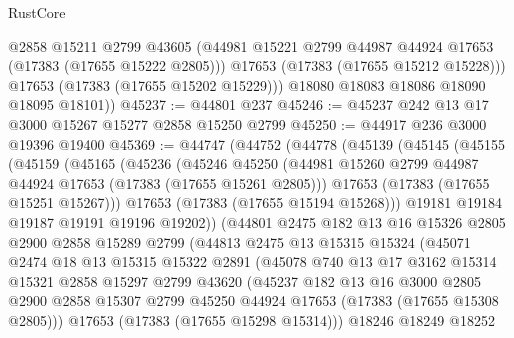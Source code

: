 \begin{lexlean}{RustCore}
\begin{coremodule}
            @2858
            @15211
            @2799
            @43605
            (@44981 @15221 @2799 @44987 @44924 @17653 (@17383 (@17655 @15222 @2805)))
            @17653
            (@17383 (@17655 @15212 @15228)))
          @17653
          (@17383 (@17655 @15202 @15229)))
        @18080
        @18083
        @18086
        @18090
        @18095
        @18101))
@45237 := @44801 @237
@45246 := @45237 @242 @13 @17 @3000 @15267 @15277 @2858 @15250 @2799
@45250 := @44917 @236 @3000 @19396 @19400
@45369 := @44747
    (@44752
      (@44778
        (@45139
          (@45145
            (@45155
              (@45159
                (@45165
                  (@45236
                    (@45246
                      @45250
                      (@44981 @15260 @2799 @44987 @44924 @17653 (@17383 (@17655 @15261 @2805)))
                      @17653
                      (@17383 (@17655 @15251 @15267)))
                    @17653
                    (@17383 (@17655 @15194 @15268)))
                  @19181
                  @19184
                  @19187
                  @19191
                  @19196
                  @19202))
              (@44801
                @2475
                @182
                @13
                @16
                @15326
                @2805
                @2900
                @2858
                @15289
                @2799
                (@44813
                  @2475
                  @13
                  @15315
                  @15324
                  (@45071
                    @2474
                    @18
                    @13
                    @15315
                    @15322
                    @2891
                    (@45078
                      @740
                      @13
                      @17
                      @3162
                      @15314
                      @15321
                      @2858
                      @15297
                      @2799
                      @43620
                      (@45237
                        @182
                        @13
                        @16
                        @3000
                        @2805
                        @2900
                        @2858
                        @15307
                        @2799
                        @45250
                        @44924
                        @17653
                        (@17383 (@17655 @15308 @2805)))
                      @17653
                      (@17383 (@17655 @15298 @15314)))
                    @18246
                    @18249
                    @18252

\end{coremodule}
\end{lexlean}
